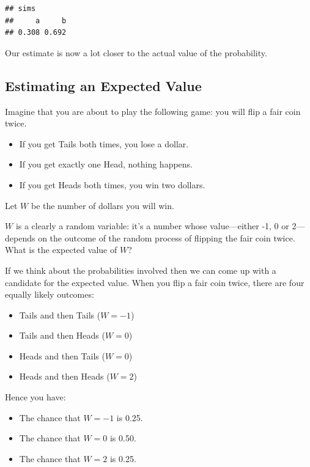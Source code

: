 \documentclass[]{book}
\providecommand{\tightlist}{%
  \setlength{\itemsep}{0pt}\setlength{\parskip}{0pt}}
\theoremstyle{definition}
\theoremstyle{definition}
\theoremstyle{definition}
\theoremstyle{remark}
\begin{document}
{\begin{verbatim}
## sims
##     a     b 
## 0.308 0.692
\end{verbatim}

Our estimate is now a lot closer to the actual value of the probability.

\subsection{Estimating an Expected
Value}\label{estimating-an-expected-value}

Imagine that you are about to play the following game: you will flip a
fair coin twice.

\begin{itemize}
\tightlist
\item
  If you get Tails both times, you lose a dollar.
\item
  If you get exactly one Head, nothing happens.
\item
  If you get Heads both times, you win two dollars.
\end{itemize}

Let \(W\) be the number of dollars you will win.

\(W\) is a clearly a random variable: it's a number whose value---either
-1, 0 or 2---depends on the outcome of the random process of flipping
the fair coin twice. What is the expected value of \(W\)?

If we think about the probabilities involved then we can come up with a
candidate for the expected value. When you flip a fair coin twice, there
are four equally likely outcomes:

\begin{itemize}
\tightlist
\item
  Tails and then Tails (\(W = -1\))
\item
  Tails and then Heads (\(W = 0\))
\item
  Heads and then Tails (\(W = 0\))
\item
  Heads and then Heads (\(W = 2\))
\end{itemize}

Hence you have:

\begin{itemize}
\tightlist
\item
  The chance that \(W=-1\) is 0.25.
\item
  The chance that \(W=0\) is 0.50.
\item
  The chance that \(W=2\) is 0.25.
\end{itemize}

}
\end{document}
